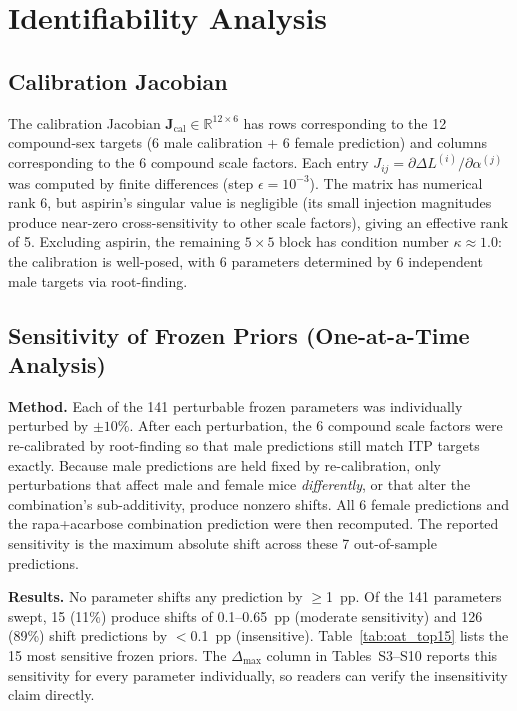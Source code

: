 \documentclass[11pt]{article}
\begin{document}
\section{Identifiability Analysis}
\label{sec:identifiability}

\subsection{Calibration Jacobian}

The calibration Jacobian $\mathbf{J}_{\text{cal}} \in \mathbb{R}^{12 \times 6}$ has rows corresponding to the 12 compound-sex targets (6 male calibration + 6 female prediction) and columns corresponding to the 6 compound scale factors. Each entry $J_{ij} = \partial \Delta L^{(i)} / \partial \alpha^{(j)}$ was computed by finite differences (step $\epsilon = 10^{-3}$). The matrix has numerical rank 6, but aspirin's singular value is negligible (its small injection magnitudes produce near-zero cross-sensitivity to other scale factors), giving an effective rank of 5. Excluding aspirin, the remaining $5 \times 5$ block has condition number $\kappa \approx 1.0$: the calibration is well-posed, with 6 parameters determined by 6 independent male targets via root-finding.

\subsection{Sensitivity of Frozen Priors (One-at-a-Time Analysis)}
\label{sec:oat}

\textbf{Method.} Each of the 141 perturbable frozen parameters was individually perturbed by $\pm 10\%$. After each perturbation, the 6 compound scale factors were re-calibrated by root-finding so that male predictions still match ITP targets exactly. Because male predictions are held fixed by re-calibration, only perturbations that affect male and female mice \emph{differently}, or that alter the combination's sub-additivity, produce nonzero shifts. All 6 female predictions and the rapa+acarbose combination prediction were then recomputed. The reported sensitivity is the maximum absolute shift across these 7 out-of-sample predictions.

\textbf{Results.} No parameter shifts any prediction by $\geq$1~pp. Of the 141 parameters swept, 15 (11\%) produce shifts of 0.1--0.65~pp (moderate sensitivity) and 126 (89\%) shift predictions by $<$0.1~pp (insensitive). Table~\ref{tab:oat_top15} lists the 15 most sensitive frozen priors. The $\Delta_{\max}$ column in Tables~S3--S10 reports this sensitivity for every parameter individually, so readers can verify the insensitivity claim directly.
\end{document}
